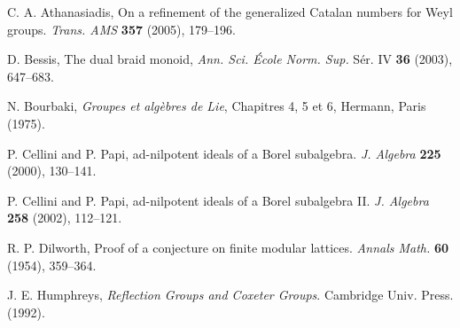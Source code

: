 \documentclass[pamq,keywordsasfootnote]{ipart}
\begin{document}
\begin{thebibliography}{9}

 C. A. Athanasiadis, On a refinement of the generalized
Catalan numbers for Weyl groups. \textit{Trans. AMS} \textbf{357} (2005), 179--196.

 D. Bessis, The dual braid monoid,
\textit{Ann. Sci. \'Ecole Norm. Sup.} S\'er. IV \textbf{36} (2003), 647--683.

 N. Bourbaki,
\textit{Groupes et alg\`ebres de Lie}, Chapitres 4, 5 et 6, Hermann,
Paris (1975).

 P. Cellini and P. Papi,
ad-nilpotent ideals of a Borel subalgebra. \textit{J. Algebra} \textbf{225} (2000), 130--141.

 P. Cellini and P. Papi,
ad-nilpotent ideals of a Borel subalgebra II. \textit{J. Algebra} \textbf{258} (2002), 112--121.

R. P. Dilworth,  Proof of a conjecture on finite modular
lattices.
\textit{Annals Math.} \textbf{60} (1954), 359--364.

J. E. Humphreys,  \textit{Reflection Groups and Coxeter Groups}.
Cambridge Univ. Press. (1992).

\end{thebibliography}
\end{document}
